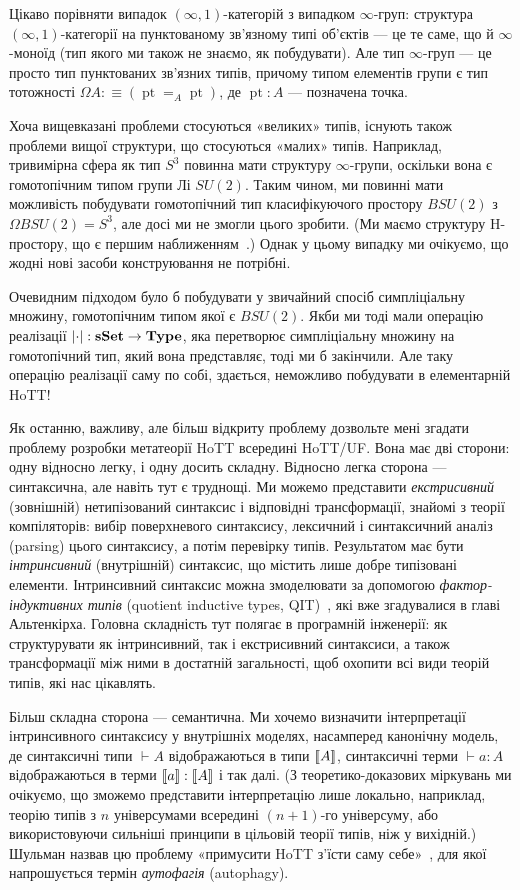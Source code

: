 \documentclass[12pt]{article}
\newcommand*{\inftyone}{\ensuremath{(\infty,1)}}
\newcommand*{\Type}{\ensuremath{\mathbf{Type}}}
\newcommand*{\sSet}{\ensuremath{\mathbf{sSet}}}
\DeclareMathOperator{\pt}{pt}
\DeclarePairedDelimiter\abs{\lvert}{\rvert} %
\DeclarePairedDelimiter\sem{[\![}{]\!]} %
\begin{document}
Цікаво порівняти випадок \inftyone-категорій з випадком $\infty$-груп: структура \inftyone-категорії на пунктованому зв'язному типі об'єктів — це те саме, що й $\infty$-моноїд (тип якого ми також не знаємо, як побудувати). Але тип $\infty$-груп — це просто тип пунктованих зв'язних типів, причому типом елементів групи є тип тотожності $\Omega A:\equiv(\pt=_A\pt)$, де $\pt:A$ — позначена точка.

Хоча вищевказані проблеми стосуються «великих» типів, існують також проблеми вищої структури, що стосуються «малих» типів. Наприклад, тривимірна сфера як тип $S^3$ повинна мати структуру $\infty$-групи, оскільки вона є гомотопічним типом групи Лі $SU(2)$. Таким чином, ми повинні мати можливість побудувати гомотопічний тип класифікуючого простору $BSU(2)$ з $\Omega BSU(2)=S^3$, але досі ми не змогли цього зробити. (Ми маємо структуру H-простору, що є першим наближенням~\cite{BuchholtzRijke2018}.) Однак у цьому випадку ми очікуємо, що жодні нові засоби конструювання не потрібні.

Очевидним підходом було б побудувати у звичайний спосіб симпліціальну множину, гомотопічним типом якої є $BSU(2)$. Якби ми тоді мали операцію реалізації $\abs\cdot : \sSet \to \Type$, яка перетворює симпліціальну множину на гомотопічний тип, який вона представляє, тоді ми б закінчили. Але таку операцію реалізації саму по собі, здається, неможливо побудувати в елементарній HoTT!

Як останню, важливу, але більш відкриту проблему дозвольте мені згадати проблему розробки метатеорії HoTT всередині HoTT/UF. Вона має дві сторони: одну відносно легку, і одну досить складну. Відносно легка сторона — синтаксична, але навіть тут є труднощі. Ми можемо представити \emph{екстрисивний} (зовнішній) нетипізований синтаксис і відповідні трансформації, знайомі з теорії компіляторів: вибір поверхневого синтаксису, лексичний і синтаксичний аналіз (parsing) цього синтаксису, а потім перевірку типів. Результатом має бути \emph{інтринсивний} (внутрішній) синтаксис, що містить лише добре типізовані елементи. Інтринсивний синтаксис можна змоделювати за допомогою \emph{фактор-індуктивних типів} (quotient inductive types, QIT)~\cite{AltenkirchKaposi2016}, які вже згадувалися в главі Альтенкірха. Головна складність тут полягає в програмній інженерії: як структурувати як інтринсивний, так і екстрисивний синтаксиси, а також трансформації між ними в достатній загальності, щоб охопити всі види теорій типів, які нас цікавлять.

Більш складна сторона — семантична. Ми хочемо визначити інтерпретації інтринсивного синтаксису у внутрішніх моделях, насамперед канонічну модель, де синтаксичні типи $\vdash A$ відображаються в типи $\sem A$, синтаксичні терми $\vdash a:A$ відображаються в терми $\sem a : \sem A$ і так далі. (З теоретико-доказових міркувань ми очікуємо, що зможемо представити інтерпретацію лише локально, наприклад, теорію типів з $n$ універсумами всередині $(n+1)$-го універсуму, або використовуючи сильніші принципи в цільовій теорії типів, ніж у вихідній.) Шульман назвав цю проблему «примусити HoTT з'їсти саму себе»~\cite{Shulman2014}, для якої напрошується термін \emph{аутофагія} (autophagy).
\end{document}
